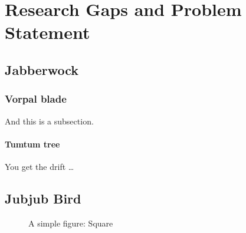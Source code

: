 %

\chapter{Research Gaps and Problem Statement}
\section{Jabberwock}
\subsection{Vorpal blade}
And this is a subsection.
	
\subsubsection{Tumtum tree}
You get the drift \ldots
		
\section{Jubjub Bird}

\begin{figure}[htbp]			%
\begin{center}
\caption{A simple figure: Square}	%
\label{circle}
\end{center}
\end{figure}

